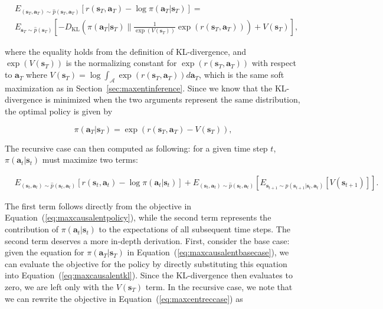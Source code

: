 \begin{align}
&E_{(\mathbf{s}_T,\mathbf{a}_T)\sim \hat{p}(\mathbf{s}_T,\mathbf{a}_T)}[r(\mathbf{s}_T,\mathbf{a}_T) - \log \pi(\mathbf{a}_T|\mathbf{s}_T)] = \nonumber \\
&E_{\mathbf{s}_T \sim \hat{p}(\mathbf{s}_T)}\left[ - D_\text{KL}\left( \pi(\mathbf{a}_T|\mathbf{s}_T) \| \frac{1}{\exp(V(\mathbf{s}_T))}\exp(r(\mathbf{s}_T,\mathbf{a}_T)) \right) + V(\mathbf{s}_T) \right],\label{eq:maxcausalentkl}
\end{align}

where the equality holds from the definition of KL-divergence, and $\exp(V(\mathbf{s}_T))$ is the normalizing constant for $\exp(r(\mathbf{s}_T,\mathbf{a}_T))$ with respect to $\mathbf{a}_T$ where $V(\mathbf{s}_T) = \log \int_{\mathcal{A}} \exp(r(\mathbf{s}_T,\mathbf{a}_T)) d\mathbf{a}_T$, which is the same soft maximization as in Section~\ref{sec:maxentinference}. Since we know that the KL-divergence is minimized when the two arguments represent the same distribution, the optimal policy is given by

\begin{equation}
\pi(\mathbf{a}_T | \mathbf{s}_T) = \exp \left(
r(\mathbf{s}_T,\mathbf{a}_T) - V(\mathbf{s}_T)
\right), \label{eq:maxcausalentbasecase}
\end{equation}

The recursive case can then computed as following: for a given time step $t$, $\pi(\mathbf{a}_t | \mathbf{s}_t)$ must maximize two terms:

\begin{align}
&E_{(\mathbf{s}_t,\mathbf{a}_t)\sim \hat{p}(\mathbf{s}_t,\mathbf{a}_t)}[r(\mathbf{s}_t,\mathbf{a}_t) - \log \pi(\mathbf{a}_t|\mathbf{s}_t)] + E_{(\mathbf{s}_t,\mathbf{a}_t)\sim \hat{p}(\mathbf{s}_t,\mathbf{a}_t)}[ E_{\mathbf{s}_{t+1} \sim p(\mathbf{s}_{t+1}|\mathbf{s}_t,\mathbf{a}_t)} [V(\mathbf{s}_{t+1})] ].\label{eq:maxcentreccase}
\end{align}

The first term follows directly from the objective in Equation~(\ref{eq:maxcausalentpolicy}), while the second term represents the contribution of $\pi(\mathbf{a}_t|\mathbf{s}_t)$ to the expectations of all subsequent time steps. The second term deserves a more in-depth derivation. First, consider the base case: given the equation for $\pi(\mathbf{a}_T | \mathbf{s}_T)$ in Equation~(\ref{eq:maxcausalentbasecase}), we can evaluate the objective for the policy by directly substituting this equation into Equation~(\ref{eq:maxcausalentkl}). Since the KL-divergence then evaluates to zero, we are left only with the $V(\mathbf{s}_T)$ term. In the recursive case, we note that we can rewrite the objective in Equation~(\ref{eq:maxcentreccase}) as

